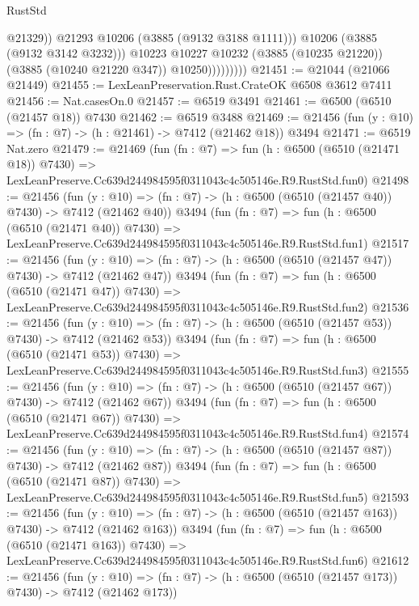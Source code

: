 \begin{lexlean}{RustStd}
\begin{coremodule}
                              @21329))
                          @21293
                          @10206
                          (@3885 (@9132 @3188 @1111)))
                        @10206
                        (@3885 (@9132 @3142 @3232)))
                      @10223
                      @10227
                      @10232
                      (@3885 (@10235 @21220))
                      (@3885 (@10240 @21220 @347))
                      @10250)))))))))
@21451 := @21044 (@21066 @21449)
@21455 := LexLeanPreservation.Rust.CrateOK @6508 @3612 @7411
@21456 := Nat.casesOn.{0}
@21457 := @6519 @3491
@21461 := @6500 (@6510 (@21457 @18)) @7430
@21462 := @6519 @3488
@21469 := @21456 (fun (y : @10) => (fn : @7) -> (h : @21461) -> @7412 (@21462 @18)) @3494
@21471 := @6519 Nat.zero
@21479 := @21469
    (fun (fn : @7) =>
    fun (h : @6500 (@6510 (@21471 @18)) @7430) =>
    LexLeanPreserve.Cc639d244984595f0311043c4c505146e.R9.RustStd.fun0)
@21498 := @21456
    (fun (y : @10) => (fn : @7) -> (h : @6500 (@6510 (@21457 @40)) @7430) -> @7412 (@21462 @40))
    @3494
    (fun (fn : @7) =>
    fun (h : @6500 (@6510 (@21471 @40)) @7430) =>
    LexLeanPreserve.Cc639d244984595f0311043c4c505146e.R9.RustStd.fun1)
@21517 := @21456
    (fun (y : @10) => (fn : @7) -> (h : @6500 (@6510 (@21457 @47)) @7430) -> @7412 (@21462 @47))
    @3494
    (fun (fn : @7) =>
    fun (h : @6500 (@6510 (@21471 @47)) @7430) =>
    LexLeanPreserve.Cc639d244984595f0311043c4c505146e.R9.RustStd.fun2)
@21536 := @21456
    (fun (y : @10) => (fn : @7) -> (h : @6500 (@6510 (@21457 @53)) @7430) -> @7412 (@21462 @53))
    @3494
    (fun (fn : @7) =>
    fun (h : @6500 (@6510 (@21471 @53)) @7430) =>
    LexLeanPreserve.Cc639d244984595f0311043c4c505146e.R9.RustStd.fun3)
@21555 := @21456
    (fun (y : @10) => (fn : @7) -> (h : @6500 (@6510 (@21457 @67)) @7430) -> @7412 (@21462 @67))
    @3494
    (fun (fn : @7) =>
    fun (h : @6500 (@6510 (@21471 @67)) @7430) =>
    LexLeanPreserve.Cc639d244984595f0311043c4c505146e.R9.RustStd.fun4)
@21574 := @21456
    (fun (y : @10) => (fn : @7) -> (h : @6500 (@6510 (@21457 @87)) @7430) -> @7412 (@21462 @87))
    @3494
    (fun (fn : @7) =>
    fun (h : @6500 (@6510 (@21471 @87)) @7430) =>
    LexLeanPreserve.Cc639d244984595f0311043c4c505146e.R9.RustStd.fun5)
@21593 := @21456
    (fun (y : @10) => (fn : @7) -> (h : @6500 (@6510 (@21457 @163)) @7430) -> @7412 (@21462 @163))
    @3494
    (fun (fn : @7) =>
    fun (h : @6500 (@6510 (@21471 @163)) @7430) =>
    LexLeanPreserve.Cc639d244984595f0311043c4c505146e.R9.RustStd.fun6)
@21612 := @21456
    (fun (y : @10) => (fn : @7) -> (h : @6500 (@6510 (@21457 @173)) @7430) -> @7412 (@21462 @173))

\end{coremodule}
\end{lexlean}
